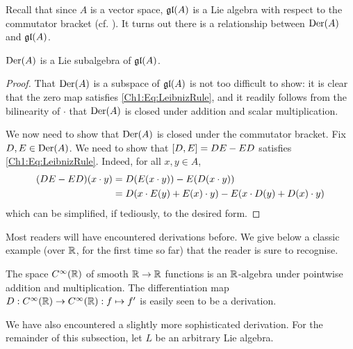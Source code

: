 Recall that since $A$ is a vector space, $\mathfrak{gl}\!\left( A \right)$ is a Lie algebra with respect to the commutator bracket (cf. ). It turns out there is a relationship between $\operatorname{Der}\!\left( A \right)$ and $\mathfrak{gl}\!\left( A \right)$.

\begin{boxproposition}\label{Ch1:Prop:DerLieSubalg}
    $\operatorname{Der}\!\left( A \right)$ is a Lie subalgebra of $\mathfrak{gl}\!\left( A \right)$.
\end{boxproposition}
\begin{proof}
    That $\operatorname{Der}\!\left( A \right)$ is a subspace of $\mathfrak{gl}\!\left( A \right)$ is not too difficult to show: it is clear that the zero map satisfies \eqref{Ch1:Eq:LeibnizRule}, and it readily follows from the bilinearity of $\cdot$ that $\operatorname{Der}\!\left( A \right)$ is closed under addition and scalar multiplication.

    We now need to show that $\operatorname{Der}\!\left( A \right)$ is closed under the commutator bracket. Fix $D, E \in \operatorname{Der}\!\left( A \right)$. We need to show that $\left[ D, E \right] = DE - ED$ satisfies \eqref{Ch1:Eq:LeibnizRule}. Indeed, for all $x, y \in A$,
    \begin{align*}
        \left( DE - ED \right)\!(x \cdot y)
        &= D\!\left( E(x \cdot y) \right) - E\!\left( D(x \cdot y) \right) \\
        &= D\!\left( x \cdot E(y) + E(x) \cdot y \right) - E\!\left( x \cdot D(y) + D(x) \cdot y \right) 
    \end{align*}
    which can be simplified, if tediously, to the desired form.
\end{proof}

Most readers will have encountered derivations before. We give below a classic example (over $\mathbb{R}$, for the first time so far) that the reader is sure to recognise.

\begin{boxexample}
    The space $C^{\infty}(\mathbb{R})$ of smooth $\mathbb{R} \to \mathbb{R}$ functions is an $\mathbb{R}$-algebra under pointwise addition and multiplication. The differentiation map $D : C^{\infty}(\mathbb{R}) \to C^{\infty}(\mathbb{R}) : f \mapsto f'$ is easily seen to be a derivation.
\end{boxexample}

We have also encountered a slightly more sophisticated derivation. For the remainder of this subsection, let $L$ be an arbitrary Lie algebra.

